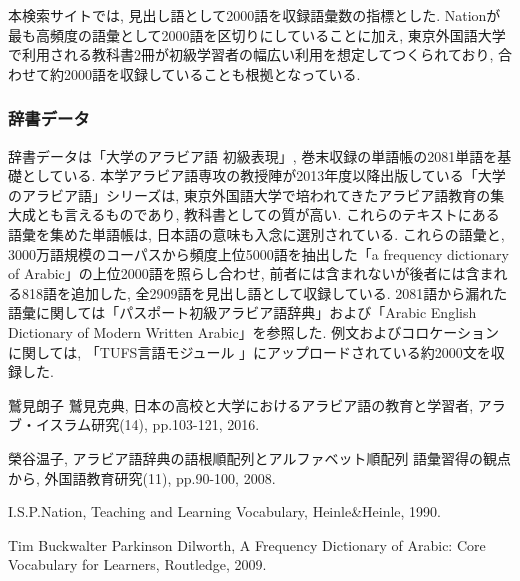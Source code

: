 \documentclass[technicalreport]{ieicej}
\begin{document}
本検索サイトでは, 見出し語として2000語を収録語彙数の指標とした. Nationが最も高頻度の語彙として2000語を区切りにしていることに加え, 東京外国語大学で利用される教科書2冊が初級学習者の幅広い利用を想定してつくられており, 合わせて約2000語を収録していることも根拠となっている.

\subsubsection{辞書データ}
辞書データは「大学のアラビア語 初級表現」, 巻末収録の単語帳の2081単語を基礎としている. 本学アラビア語専攻の教授陣が2013年度以降出版している「大学のアラビア語」シリーズは, 東京外国語大学で培われてきたアラビア語教育の集大成とも言えるものであり, 教科書としての質が高い. これらのテキストにある語彙を集めた単語帳は, 日本語の意味も入念に選別されている. これらの語彙と, 3000万語規模のコーパスから頻度上位5000語を抽出した「a frequency dictionary of Arabic」の上位2000語を照らし合わせ, 前者には含まれないが後者には含まれる818語を追加した, 全2909語を見出し語として収録している. 2081語から漏れた語彙に関しては「パスポート初級アラビア語辞典」および「Arabic English Dictionary of Modern Written Arabic」を参照した. 例文およびコロケーションに関しては, 「TUFS言語モジュール 」にアップロードされている約2000文を収録した.

\begin{thebibliography}{99}
鷲見朗子 鷲見克典, 日本の高校と大学におけるアラビア語の教育と学習者, アラブ・イスラム研究(14), pp.103-121, 2016.

榮谷温子, アラビア語辞典の語根順配列とアルファベット順配列 語彙習得の観点から, 外国語教育研究(11), pp.90-100, 2008.

I.S.P.Nation, Teaching and Learning Vocabulary, Heinle\&Heinle, 1990. 

Tim Buckwalter  Parkinson Dilworth, A Frequency Dictionary of Arabic: Core Vocabulary for Learners, Routledge, 2009.

\end{thebibliography}
\end{document}

